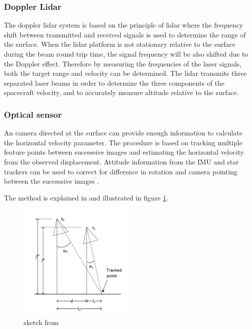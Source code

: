 \subsubsection{Doppler Lidar}

The doppler lidar system is based on the principle of lidar where the frequency shift between transmitted and received signals is used to determine the range of the surface. When the lidar platform is not stationary relative to the surface during the  beam round trip time, the signal frequency will be also shifted due to the Doppler effect. Therefore by measuring the frequencies of the laser signals, both the target range and velocity can be
determined. The lidar transmits three separated laser beams in order to determine the three components of the spacecraft velocity, and to accurately measure altitude relative to the surface. 
 

  
\subsubsection{Optical sensor}
An camera directed at the surface can provide enough information to calculate the horizontal velocity parameter. The procedure is based on tracking multiple feature points between successive images and estimating the horizontal velocity from the observed displacement. Attitude information from the IMU and star trackers can be used to correct for difference in rotation and camera pointing between the successive images \cite{alessandro}.

The method is explained in \cite{alessandro} and illustrated in figure \ref{horvel}.

\begin{figure}
\begin{center}
\includegraphics[width=0.5\textwidth]{figures/navtheory/horvel}
\caption{sketch from \cite{alessandro}}
\label{horvel}
\end{center}
\end{figure}


